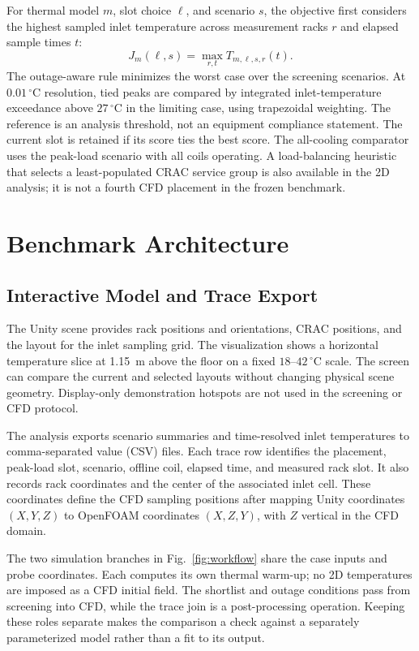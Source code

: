 \documentclass{ieeeaccess}
\begin{document}
For thermal model $m$, slot choice $\ell$, and scenario $s$, the objective first considers the highest sampled inlet temperature across measurement racks $r$ and elapsed sample times $t$:
\begin{equation}
J_m(\ell,s)=\max_{r,t}T_{m,\ell,s,r}(t).
\label{eq:case-peak}
\end{equation}
The outage-aware rule minimizes the worst case over the screening scenarios. At $0.01\,^{\circ}\mathrm{C}$ resolution, tied peaks are compared by integrated inlet-temperature exceedance above $27\,^{\circ}\mathrm{C}$ in the limiting case, using trapezoidal weighting. The reference is an analysis threshold, not an equipment compliance statement. The current slot is retained if its score ties the best score. The all-cooling comparator uses the peak-load scenario with all coils operating. A load-balancing heuristic that selects a least-populated CRAC service group is also available in the 2D analysis; it is not a fourth CFD placement in the frozen benchmark.

\section{Benchmark Architecture}
\subsection{Interactive Model and Trace Export}
The Unity scene provides rack positions and orientations, CRAC positions, and the layout for the inlet sampling grid. The visualization shows a horizontal temperature slice at 1.15~m above the floor on a fixed $18$--$42\,^{\circ}\mathrm{C}$ scale. The screen can compare the current and selected layouts without changing physical scene geometry. Display-only demonstration hotspots are not used in the screening or CFD protocol.

The analysis exports scenario summaries and time-resolved inlet temperatures to comma-separated value (CSV) files. Each trace row identifies the placement, peak-load slot, scenario, offline coil, elapsed time, and measured rack slot. It also records rack coordinates and the center of the associated inlet cell. These coordinates define the CFD sampling positions after mapping Unity coordinates $(X,Y,Z)$ to OpenFOAM coordinates $(X,Z,Y)$, with $Z$ vertical in the CFD domain.

The two simulation branches in Fig.~\ref{fig:workflow} share the case inputs and probe coordinates. Each computes its own thermal warm-up; no 2D temperatures are imposed as a CFD initial field. The shortlist and outage conditions pass from screening into CFD, while the trace join is a post-processing operation. Keeping these roles separate makes the comparison a check against a separately parameterized model rather than a fit to its output.
\end{document}
